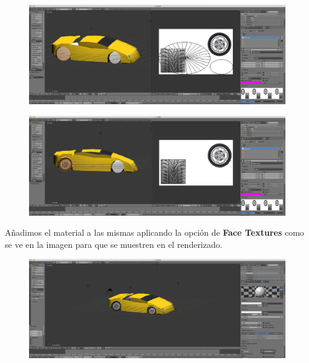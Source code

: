 \documentclass[10pt]{article}
\begin{document}
\begin{figure}[H]
	\begin{center}
	 		\includegraphics[width = 1.00\textwidth]{Imagenes/p3-img21}
	\end{center} 
\end{figure}

\begin{figure}[H]
	\begin{center}
	 		\includegraphics[width = 1.00\textwidth]{Imagenes/p3-img22}
	\end{center} 
\end{figure}

Añadimos el material a las mismas aplicando la opción de \textbf{Face Textures} como se ve en la imagen para que se muestren en el renderizado. \\

\begin{figure}[H]
	\begin{center}
	 		\includegraphics[width = 1.00\textwidth]{Imagenes/p3-img25}
	\end{center} 
\end{figure}
\end{document}
